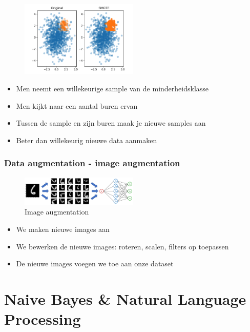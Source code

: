 \documentclass{article}
\begin{document}
\begin{figure}[H]
    \centering
    \includegraphics[width=0.5\textwidth]{smote.png}
\end{figure}

\begin{itemize}
    \item Men neemt een willekeurige sample van de minderheidsklasse
    \item Men kijkt naar een aantal buren ervan
    \item Tussen de sample en zijn buren maak je nieuwe samples aan
    \item Beter dan willekeurig nieuwe data aanmaken
\end{itemize}

\subsubsection{Data augmentation - image augmentation}

\begin{figure}[H]
    \centering
    \includegraphics[width=0.5\textwidth]{image-augmentation.png}
    \caption{Image augmentation}
\end{figure}

\begin{itemize}
    \item We maken nieuwe images aan
    \item We bewerken de nieuwe images: roteren, scalen, filters op toepassen
    \item De nieuwe images voegen we toe aan onze dataset
\end{itemize}

\section{Naive Bayes \& Natural Language Processing}
\end{document}
